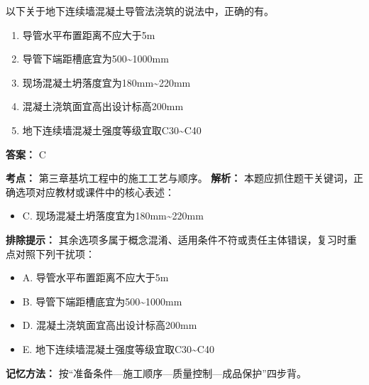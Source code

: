 \documentclass[UTF8,fontset=fandol,11pt]{ctexart}
\begin{document}
\begin{quizbox}[title={第 6 题}]
以下关于地下连续墙混凝土导管法浇筑的说法中，正确的有。\\
\begin{enumerate}[label=\Alph*.]
\item 导管水平布置距离不应大于5m
\item 导管下端距槽底宜为500\textasciitilde{}1000mm
\item 现场混凝土坍落度宜为180mm\textasciitilde{}220mm
\item 混凝土浇筑面宜高出设计标高200mm
\item 地下连续墙混凝土强度等级宜取C30\textasciitilde{}C40
\end{enumerate}
\textbf{答案：} C
\vspace{0.25em}
\begin{answerbox}[title={考点解析}]
\textbf{考点：} 第三章基坑工程中的施工工艺与顺序。
\textbf{解析：} 本题应抓住题干关键词，正确选项对应教材或课件中的核心表述：
\begin{itemize}
\item C. 现场混凝土坍落度宜为180mm\textasciitilde{}220mm
\end{itemize}
\textbf{排除提示：} 其余选项多属于概念混淆、适用条件不符或责任主体错误，复习时重点对照下列干扰项：
\begin{itemize}
\item A. 导管水平布置距离不应大于5m
\item B. 导管下端距槽底宜为500\textasciitilde{}1000mm
\item D. 混凝土浇筑面宜高出设计标高200mm
\item E. 地下连续墙混凝土强度等级宜取C30\textasciitilde{}C40
\end{itemize}
\textbf{记忆方法：} 按“准备条件—施工顺序—质量控制—成品保护”四步背。
\end{answerbox}
\end{quizbox}

\vspace{0.2em}
\end{document}
